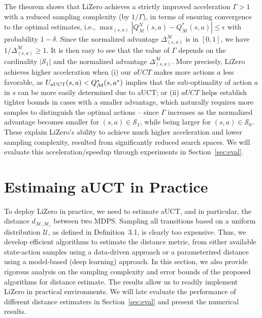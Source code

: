 The theorem shows that LiZero achieves a strictly improved acceleration $\Gamma>1$ with a reduced sampling complexity (by $1/\Gamma$), in terms of ensuring convergence to the optimal estimates, i.e., $\max_{(s,a)}|Q^{N}_{\mathcal{M}}(s,a)-Q_{\mathcal{M}}^{*}(s,a)|\leq \epsilon$ with probability \(1-\delta\). Since the normalized advantage $\Delta^{\mathcal{M}}_{(s,a)}$ is in $[0,1]$, we have $1/\Delta^{\mathcal{M}}_{(s,a)}\ge 1$. It is then easy to see that the value of $\Gamma$ depends on the cardinality $|\mathcal{S}_1|$ and the normalized advantage $\Delta^{\mathcal{M}}_{(s,a)}$. More precisely, LiZero achieves higher acceleration when (i) our $aUCT$ makes more actions $a$ less favorable, as $U_{\rm aUCT}(s, a) < Q^{*}_{\mathcal{M}}(s, a^{*})$ implies that the sub-optimality of action $a$ in $s$ can be more easily determined due to aUCT; or (ii) $aUCT$ helps establish tighter bounds in cases with a smaller advantage, which naturally requires more samples to distinguish the optimal actions -- since $\Gamma$ increases as the normalized advantage becomes smaller for $(s,a)\in \mathcal{S}_1$, while being larger for $(s,a)\in \mathcal{S}_0$. These explain LiZero's ability to achieve much higher acceleration and lower sampling complexity, resulted from significantly reduced search spaces. We will evaluate this acceleration/speedup through experiments in Section~\ref{sec:eval}.




\section{Estimaing aUCT in Practice}
\label{sec:distance}

To deploy LiZero in practice, we need to estimate aUCT, and in particular, the distance $d_{\mathcal{M}, \mathcal{M}_i}$ between two MDPS. Sampling all transitions based on a uniform distribution $\mathcal{U}$, as defined in Definition~3.1, is clearly too expensive. Thus, we develop efficient algorithms to estimate the distance metric, from either available state-action samples using a data-driven approach or a parameterized distance using a model-based (deep learning) approach. In this section, we also provide rigorous analysis on the sampling complexity and error bounds of the proposed algorithms for distance estimate. The results allow us to readily implement LiZero in practical environments. We will late evaluate the performance of different distance estimaters in Section~\ref{sec:eval} and present the numerical results.

